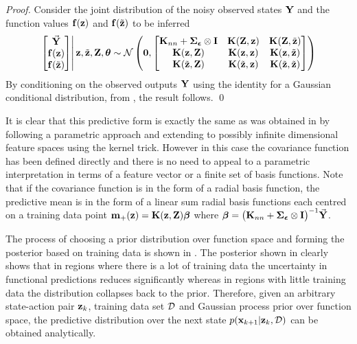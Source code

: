 \begin{proof}
Consider the joint distribution of the noisy observed states $\mathbf{Y}$ and the function values $\mathbf{f}(\mathbf{z})$ and $\mathbf{f}(\tilde{\mathbf{z}})$ to be inferred
\begin{equation}
\left.\begin{bmatrix} \vec{\mathbf{Y}} \\ \mathbf{f}(\mathbf{z}) \\ \mathbf{f}(\tilde{\mathbf{z}}) \end{bmatrix} \right| \mathbf{z}, \tilde{\mathbf{z}}, \mathbf{Z}, \boldsymbol{\theta}  \sim \mathcal{N}\left(
\mathbf{0},
\begin{bmatrix} \mathbf{K}_{nn}+\boldsymbol{\Sigma}_{\boldsymbol{\epsilon}}\otimes\mathbf{I} & \mathbf{K}(\mathbf{Z},\mathbf{z}) & \mathbf{K}(\mathbf{Z},\tilde{\mathbf{z}}) \\ 
\mathbf{K}(\mathbf{z},\mathbf{Z}) & \mathbf{K}(\mathbf{z},\mathbf{z}) & \mathbf{K}(\mathbf{z},\tilde{\mathbf{z}}) \\
\mathbf{K}(\tilde{\mathbf{z}},\mathbf{Z}) & \mathbf{K}(\tilde{\mathbf{z}},\mathbf{z}) & \mathbf{K}(\tilde{\mathbf{z}},\tilde{\mathbf{z}}) \end{bmatrix}
\right)
\end{equation}
By conditioning on the observed outputs $\mathbf{Y}$ using the identity for a Gaussian conditional distribution, from , the result follows.
\qed
\end{proof}

It is clear that this predictive form is exactly the same as was obtained in  by following a parametric approach and extending to possibly infinite dimensional feature spaces using the kernel trick. However in this case the covariance function has been defined directly and there is no need to appeal to a parametric interpretation in terms of a feature vector or a finite set of basis functions.
%
Note that if the covariance function is in the form of a radial basis function, the predictive mean is in the form of a linear sum radial basis functions each centred on a training data point $\mathbf{m}_{+}(\mathbf{z}) = \mathbf{K}(\mathbf{z},\mathbf{Z}) \boldsymbol{\beta}$ where $\boldsymbol{\beta} = \big(\mathbf{K}_{nn}+\boldsymbol{\Sigma}_{\boldsymbol{\epsilon}}\otimes\mathbf{I}\big)^{-1} \vec{\mathbf{Y}}$.

The process of choosing a prior distribution over function space and forming the posterior based on training data is shown in . The posterior shown in  clearly shows that in regions where there is a lot of training data the uncertainty in functional predictions reduces significantly whereas in regions with little training data the distribution collapses back to the prior.
Therefore, given an arbitrary state-action pair $\mathbf{z}_k$, training data set $\mathcal{D}$ and Gaussian process prior over function space, the predictive distribution over the next state $p(\mathbf{x}_{k+1}|\mathbf{z}_k,\mathcal{D})$ can be obtained analytically. 










